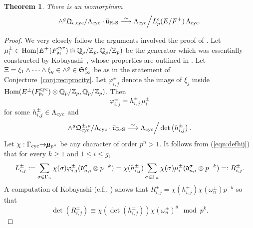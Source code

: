 \documentclass[12pt]{amsart}
\numberwithin{equation}{section}
\newtheorem{thm}{Theorem}[section]
\begin{document}
\begin{thm}
\label{thm:localmainconj}
There is an isomorphism
$$\wedge^g \frak{Q}_{\epsilon,\textup{cyc}}/{\Lambda}_{\textup{cyc}}\cdot\bar{\frak{u}}_{\textup{R-S}} \stackrel{\sim}{\longrightarrow} {\Lambda}_{\textup{cyc}}\Big{/}L_p^\epsilon(E/F^+)\,{\Lambda}_{\textup{cyc}}.$$
\end{thm}
\begin{proof}
We very closely follow the arguments involved the proof of \cite[Theorem 7.2]{pollackrubin}. Let $\mu_{i}^\pm \in \textup{Hom}(E^\pm(F^{\textup{cyc}}_{\frak{p}_i})\otimes{\mathbb{Q}}_p/{\mathbb{Z}}_p,{\mathbb{Q}}_p/{\mathbb{Z}}_p)$ be the generator which was essentially constructed by Kobayashi~\cite[Theorem 6.2]{kobayashi03}, whose properties are outlined in \cite[Theorem 7.1]{pollackrubin}. Let $\Xi=\xi_1\wedge \cdots\wedge \xi_g \in \wedge^g \in \frak{S}_{\infty}^\rho$ be as in the statement of Conjecture~\ref{conj:reciprocity}. Let $\varphi^{\pm}_{i,j}$ denote the image of $\xi_j$ inside $\textup{Hom}(E^\pm(F^{\textup{cyc}}_{\frak{p}_i})\otimes{\mathbb{Q}}_p/{\mathbb{Z}}_p,{\mathbb{Q}}_p/{\mathbb{Z}}_p)$. Then
\begin{equation}\label{eqn:defhij}\varphi^{\pm}_{i,j}=h^{\pm}_{i,j}\,\mu^{\pm}_{i}\end{equation}
for some $h_{i,j}^\pm \in {\Lambda}_{\textup{cyc}}$ and
\begin{equation}
\label{eqn:crucialdet1}
\wedge^g \frak{Q}_{\textup{cyc}}^{\pm,\rho}/{\Lambda}_{\textup{cyc}}\cdot\bar{\frak{u}}_{\textup{R-S}} \stackrel{\sim}{\longrightarrow} {\Lambda}_{\textup{cyc}}\Big{/}\det\left(h_{i,j}^\pm\right).
\end{equation}
Let $\chi:\Gamma_{\textup{cyc}}{\rightarrow} \pmb{\mu}_{p^n}$ be any character of order $p^n>1$. It follows from (\ref{eqn:defhij}) that for every $k\geq 1$ and $1\leq i\leq g$,
\begin{equation}
\label{eqn:identityphih}
L_{i,j}^\pm:=\sum_{\sigma\in \Gamma_n}\chi(\sigma)\varphi_{i,j}^\pm(\frak{d}_{n,i}^\sigma\otimes p^{-k})=\chi(h_{i,j}^\pm)\sum_{\sigma\in \Gamma_n}\chi(\sigma)\mu_{i}^\pm(\frak{d}_{n,i}^\sigma\otimes p^{-k})=:R_{i,j}^{\pm}.
\end{equation}
A computation of Kobayashi (c.f., \cite[Theorem 7.1]{pollackrubin}) shows that
$R_{i,j}^\pm=\chi(h_{i,j}^{\pm})\chi(\omega_n^\pm)p^{-k}$ so that
\begin{equation}
\label{eqn:rightexplicit}
\det\left(R_{i,j}^\pm\right)\equiv\chi\left(\det\left(h_{i,j}^{\pm}\right)\right)\chi(\omega_n^\pm)^g \mod p^{k}.
\end{equation}

\end{proof}
\end{document}
